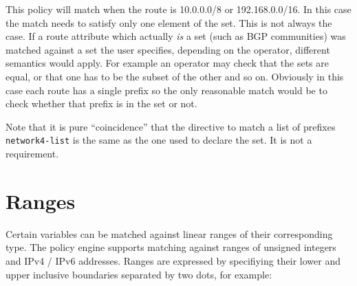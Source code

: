 \noindent{}

This policy will match when the route is 10.0.0.0/8 or 192.168.0.0/16.  In this
case the match needs to satisfy only one element of the set.  This is not always
the case.  If a route attribute which actually {\em is} a set (such as BGP
communities) was matched against a set the user specifies, depending on the
operator, different semantics would apply.  For example an operator may check
that the sets are equal, or that one has to be the subset of the other and so
on.  Obviously in this case each route has a single prefix so the only
reasonable match would be to check whether that prefix is in the set or not.

Note that it is pure ``coincidence'' that the directive to match a list of
prefixes {\tt network4-list} is the same as the one used to declare the set.  It
is not a requirement.

\section{Ranges}
Certain variables can be matched against linear ranges of their corresponding type.
The policy engine supports matching against ranges of unsigned integers and IPv4 / IPv6 addresses.
Ranges are expressed by specifiying their lower and upper inclusive boundaries separated by two dots, for example:

